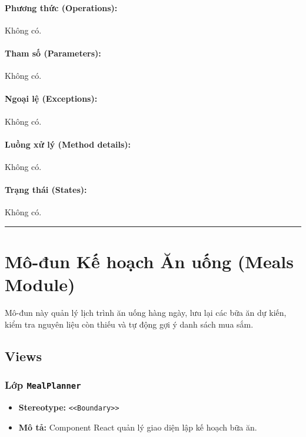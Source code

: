 \documentclass[12pt,a4paper]{article}
\begin{document}
\paragraph{Phương thức (Operations):}
Không có.

\paragraph{Tham số (Parameters):}
Không có.

\paragraph{Ngoại lệ (Exceptions):}
Không có.

\paragraph{Luồng xử lý (Method details):}
Không có.

\paragraph{Trạng thái (States):}
Không có.

\vskip 0.5cm
\noindent\rule{\textwidth}{0.5pt}
\vskip 0.5cm

\section{Mô-đun Kế hoạch Ăn uống (Meals Module)}

Mô-đun này quản lý lịch trình ăn uống hàng ngày, lưu lại các bữa ăn dự kiến, kiểm tra nguyên liệu còn thiếu và tự động gợi ý danh sách mua sắm.

\subsection{Views}

\subsubsection{Lớp \texttt{MealPlanner}}
\begin{itemize}[leftmargin=*]
    \item \textbf{Stereotype:} \texttt{\textless{}\textless{}Boundary\textgreater{}\textgreater{}}
    \item \textbf{Mô tả:} Component React quản lý giao diện lập kế hoạch bữa ăn.
\end{itemize}
\end{document}
